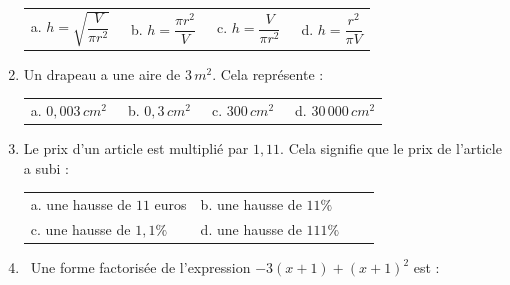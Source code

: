 \documentclass{article}
\begin{document}
\begin{enumerate}[left=0pt,itemsep=10pt]
\begin{tabular}{l@{\qquad}l@{\qquad}l@{\qquad}l}

a. $h=\sqrt{\dfrac{V}{\pi r^2}}$ 

& b. $h=\dfrac{\pi r^2}{V}$ 

& c. $h=\dfrac{V}{\pi r^2}$ 

& d. $h=\dfrac{r^2}{\pi V}$

\end{tabular}



\vspace{0.8cm}



\item Un drapeau a une aire de $3\,m^2$. Cela représente :



\begin{tabular}{l@{\qquad}l@{\qquad}l@{\qquad}l}

a. $0{,}003\,cm^2$ 

& b. $0{,}3\,cm^2$ 

& c. $300\,cm^2$ 

& d. $30\,000\,cm^2$ \\

\end{tabular}



\vspace{0,8cm}



\item Le prix d'un article est multiplié par $1,11$. Cela signifie que le prix de l'article a subi : 



\begin{tabular}{l@{\qquad}l@{\qquad}l@{\qquad}l}

a. une hausse de $11$ euros

& b. une hausse de $11\%$ \\

c. une hausse de $1{,}1\%$ 

& d. une hausse de $111\%$ \\

\end{tabular}



\vspace{0,8cm}



\item  Une forme factorisée de l'expression $-3(x+1)+(x+1)^2$ est :




\end{enumerate}
\end{document}
